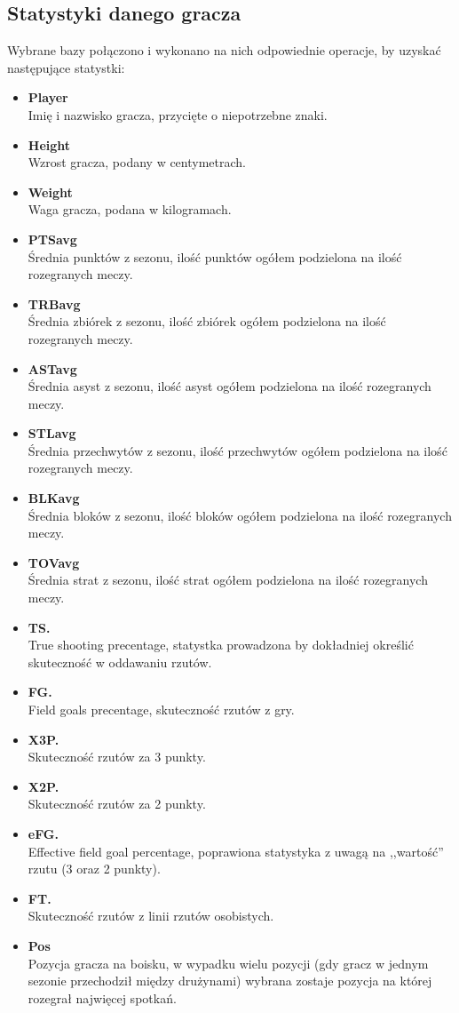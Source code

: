 \documentclass[twoside,twocolumn]{article}
\begin{document}
\subsection{Statystyki danego gracza}
Wybrane bazy połączono i wykonano na nich odpowiednie operacje, by uzyskać następujące statystki:
\begin{itemize}
\item \textbf{Player}\\
Imię i nazwisko gracza, przycięte o niepotrzebne znaki.
\item \textbf{Height}\\
Wzrost gracza, podany w centymetrach.
\item \textbf{Weight}\\
Waga gracza, podana w kilogramach.
\item \textbf{PTSavg}\\
Średnia punktów z sezonu, ilość punktów ogółem podzielona na ilość rozegranych meczy.
\item \textbf{TRBavg}\\
Średnia zbiórek z sezonu, ilość zbiórek ogółem podzielona na ilość rozegranych meczy.
\item \textbf{ASTavg}\\
Średnia asyst z sezonu, ilość asyst ogółem podzielona na ilość rozegranych meczy.
\item \textbf{STLavg}\\
Średnia przechwytów z sezonu, ilość przechwytów ogółem podzielona na ilość rozegranych meczy.
\item \textbf{BLKavg}\\
Średnia bloków z sezonu, ilość bloków ogółem podzielona na ilość rozegranych meczy.
\item \textbf{TOVavg}\\
Średnia strat z sezonu, ilość strat ogółem podzielona na ilość rozegranych meczy.
\item \textbf{TS.}\\
True shooting precentage, statystka prowadzona by dokładniej określić skuteczność w oddawaniu rzutów.
\item \textbf{FG.}\\
Field goals precentage, skuteczność rzutów z gry.
\item \textbf{X3P.}\\
Skuteczność rzutów za 3 punkty.
\item \textbf{X2P.}\\
Skuteczność rzutów za 2 punkty.
\item \textbf{eFG.}\\
Effective field goal percentage, poprawiona statystyka z uwagą na ,,wartość'' rzutu (3 oraz 2 punkty).
\item \textbf{FT.}\\
Skuteczność rzutów z linii rzutów osobistych.
\item \textbf{Pos}\\
Pozycja gracza na boisku, w wypadku wielu pozycji (gdy gracz w jednym sezonie przechodził między drużynami) wybrana zostaje pozycja na której rozegrał najwięcej spotkań.
\end{itemize}
\end{document}
